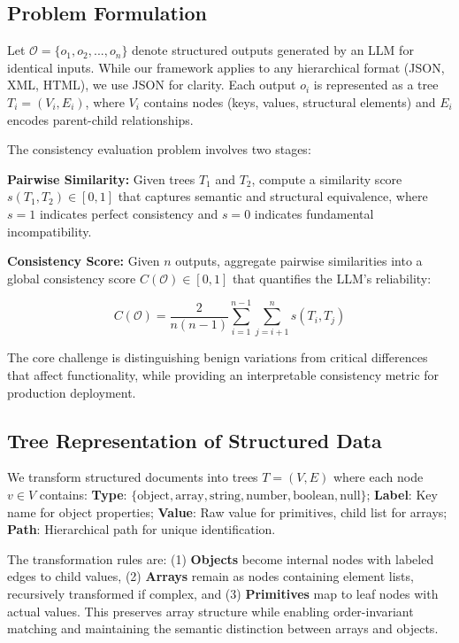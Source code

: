 \documentclass{article}
\begin{document}
\subsection{Problem Formulation}

Let $\mathcal{O} = \{o_1, o_2, ..., o_n\}$ denote structured outputs generated by an LLM for identical inputs. While our framework applies to any hierarchical format (JSON, XML, HTML), we use JSON for clarity. Each output $o_i$ is represented as a tree $T_i = (V_i, E_i)$, where $V_i$ contains nodes (keys, values, structural elements) and $E_i$ encodes parent-child relationships.

The consistency evaluation problem involves two stages:

\textbf{Pairwise Similarity:} Given trees $T_1$ and $T_2$, compute a similarity score $s(T_1, T_2) \in [0, 1]$ that captures semantic and structural equivalence, where $s = 1$ indicates perfect consistency and $s = 0$ indicates fundamental incompatibility.

\textbf{Consistency Score:} Given $n$ outputs, aggregate pairwise similarities into a global consistency score $C(\mathcal{O}) \in [0, 1]$ that quantifies the LLM's reliability:

\begin{equation}
C(\mathcal{O}) = \frac{2}{n(n-1)} \sum_{i=1}^{n-1} \sum_{j=i+1}^{n} s(T_i, T_j)
\end{equation}

The core challenge is distinguishing benign variations from critical differences that affect functionality, while providing an interpretable consistency metric for production deployment.

\subsection{Tree Representation of Structured Data}

We transform structured documents into trees $T = (V, E)$ where each node $v \in V$ contains: \textbf{Type}: $\{\text{object}, \text{array}, \text{string}, \text{number}, \text{boolean}, \text{null}\}$; \textbf{Label}: Key name for object properties; \textbf{Value}: Raw value for primitives, child list for arrays; \textbf{Path}: Hierarchical path for unique identification.

The transformation rules are: (1) \textbf{Objects} become internal nodes with labeled edges to child values, (2) \textbf{Arrays} remain as nodes containing element lists, recursively transformed if complex, and (3) \textbf{Primitives} map to leaf nodes with actual values. This preserves array structure while enabling order-invariant matching and maintaining the semantic distinction between arrays and objects.
\end{document}
